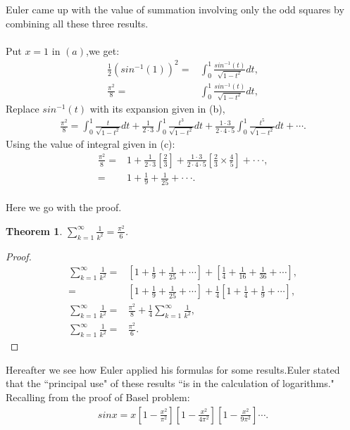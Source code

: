 \documentclass[a4paper,reqno,11pt]{book}
\theoremstyle{plain}%
\newtheorem{thm}{Theorem}[chapter]
\theoremstyle{definition}
\begin{document}
\noindent Euler came up with the value of summation involving only the odd squares by combining all these three results.\\
\\
Put $x=1$ in $(a)$,we get:\\
\begin{align*}
    \frac{1}{2}(sin^{-1}(1))^2=&\int_{0}^{1}\frac{sin^{-1}(t)}{\sqrt{1-t^2}}dt,\\
    \frac{\pi^2}{8}=&\int_{0}^{1}\frac{sin^{-1}(t)}{\sqrt{1-t^2}}dt,
\end{align*}
Replace $sin^{-1}(t)$  with its expansion given in (b),
\begin{eqnarray*}
\frac{\pi^2}{8}=\int_{0}^{1}\frac{t}{\sqrt{1-t^2}}dt+\frac{1}{2\cdot3}\int_{0}^{1}\frac{t^3}{\sqrt{1-t^2}}dt+\frac{1\cdot3}{2\cdot4\cdot5}\int_{0}^{1}\frac{t^5}{\sqrt{1-t^2}}dt+\cdots.
\end{eqnarray*}
Using the value of integral given in (c):
\begin{align*}
    \frac{\pi^2}{8}=&1+\frac{1}{2\cdot3}\left[\frac{2}{3}\right]+\frac{1\cdot3}{2\cdot4\cdot5}\left[\frac{2}{3}\times\frac{4}{5}\right]+\cdot\cdot\cdot,\\
    =&1+\frac{1}{9}+\frac{1}{25}+\cdot\cdot\cdot.
\end{align*}
\\
Here we go with the proof.
\begin{thm}\label{thm:Type 3}
    $\sum_{k=1}^{\infty}\frac{1}{k^2}=\frac{\pi^2}{6}$.
\end{thm}
\begin{proof}
  \begin{align*}
    \sum_{k=1}^{\infty}\frac{1}{k^2}=&\left[1+\frac{1}{9}+\frac{1}{25}+\cdots\right]+\left[\frac{1}{4}+\frac{1}{16}+\frac{1}{36}+\cdots\right],\\
    =&\left[1+\frac{1}{9}+\frac{1}{25}+\cdots\right]+\frac{1}{4}\left[1+\frac{1}{4}+\frac{1}{9}+\cdots\right],\\
    \sum_{k=1}^{\infty}\frac{1}{k^2}=&\frac{\pi^2}{8}+\frac{1}{4}\sum_{k=1}^{\infty}\frac{1}{k^2},\\
    \sum_{k=1}^{\infty}\frac{1}{k^2}=&\frac{\pi^2}{6}.
  \end{align*}
\end{proof}
\noindent Hereafter we see how Euler applied his formulas for some results.Euler stated that the ``principal use" of these results ``is in the calculation of logarithms."\cite{ref11}\\
Recalling from the proof of Basel problem:
\begin{eqnarray*}
    sinx=x\left[1-\frac{x^2}{\pi^2}\right]\left[1-\frac{x^2}{4\pi^2}\right]\left[1-\frac{x^2}{9\pi^2}\right]\cdots.
\end{eqnarray*}
\end{document}
